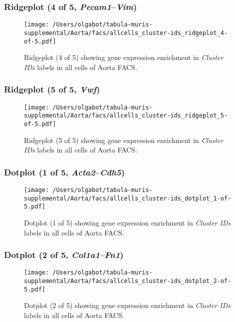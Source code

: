 \clearpage

\subsubsection{Ridgeplot (4 of 5, \emph{Pecam1}--\emph{Vim})}
\begin{figure}[h]
\centering
\texttt{[image: /Users/olgabot/tabula-muris-supplemental/Aorta/facs/allcells\_cluster-ids\_ridgeplot\_4-of-5.pdf]}

\caption{ Ridgeplot (4 of 5)  showing gene expression enrichment in \emph{Cluster IDs} labels in all cells of Aorta FACS. }
\end{figure}


\clearpage

\subsubsection{Ridgeplot (5 of 5, \emph{Vwf})}
\begin{figure}[h]
\centering
\texttt{[image: /Users/olgabot/tabula-muris-supplemental/Aorta/facs/allcells\_cluster-ids\_ridgeplot\_5-of-5.pdf]}

\caption{ Ridgeplot (5 of 5)  showing gene expression enrichment in \emph{Cluster IDs} labels in all cells of Aorta FACS. }
\end{figure}


\clearpage

\subsubsection{Dotplot (1 of 5, \emph{Acta2}--\emph{Cdh5})}
\begin{figure}[h]
\centering
\texttt{[image: /Users/olgabot/tabula-muris-supplemental/Aorta/facs/allcells\_cluster-ids\_dotplot\_1-of-5.pdf]}

\caption{ Dotplot (1 of 5)  showing gene expression enrichment in \emph{Cluster IDs} labels in all cells of Aorta FACS. }
\end{figure}


\clearpage

\subsubsection{Dotplot (2 of 5, \emph{Col1a1}--\emph{Fn1})}
\begin{figure}[h]
\centering
\texttt{[image: /Users/olgabot/tabula-muris-supplemental/Aorta/facs/allcells\_cluster-ids\_dotplot\_2-of-5.pdf]}

\caption{ Dotplot (2 of 5)  showing gene expression enrichment in \emph{Cluster IDs} labels in all cells of Aorta FACS. }
\end{figure}


